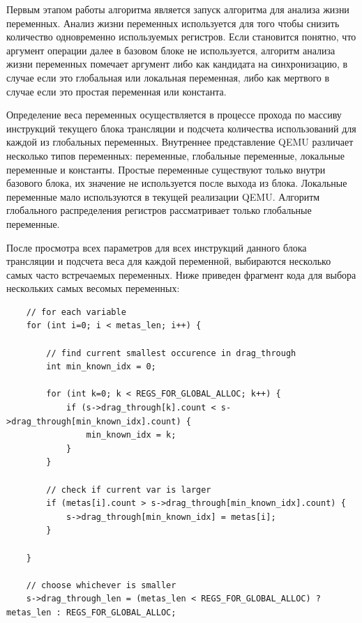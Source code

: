 Первым этапом работы алгоритма является запуск алгоритма для анализа жизни переменных. Анализ жизни переменных
используется для того чтобы снизить количество одновременно используемых регистров. Если становится понятно, что аргумент операции далее в базовом блоке не используется, алгоритм анализа жизни переменных помечает аргумент либо как кандидата на синхронизацию, в случае если это глобальная или локальная переменная, либо как мертвого в случае если это простая переменная или константа.

Определение веса переменных осуществляется в процессе прохода по массиву инструкций текущего блока трансляции и подсчета количества использований для каждой из глобальных переменных. Внутреннее представление QEMU различает несколько типов переменных: переменные, глобальные переменные, локальные переменные и константы. Простые переменные существуют только внутри базового блока, их значение не используется после выхода из блока. Локальные переменные мало используются в текущей реализации QEMU. Алгоритм глобального распределения регистров рассматривает только глобальные переменные.

После просмотра всех параметров для всех инструкций данного блока трансляции и подсчета веса для каждой переменной, выбираются несколько самых часто встречаемых переменных. Ниже приведен фрагмент кода для выбора нескольких самых весомых переменных:

\begin{small}
\begin{verbatim}
    // for each variable
    for (int i=0; i < metas_len; i++) {

        // find current smallest occurence in drag_through
        int min_known_idx = 0;

        for (int k=0; k < REGS_FOR_GLOBAL_ALLOC; k++) {
            if (s->drag_through[k].count < s->drag_through[min_known_idx].count) {
                min_known_idx = k;
            }
        }
        
        // check if current var is larger
        if (metas[i].count > s->drag_through[min_known_idx].count) {
            s->drag_through[min_known_idx] = metas[i];
        }
        
    }

    // choose whichever is smaller
    s->drag_through_len = (metas_len < REGS_FOR_GLOBAL_ALLOC) ? metas_len : REGS_FOR_GLOBAL_ALLOC;
\end{verbatim}
\end{small}


